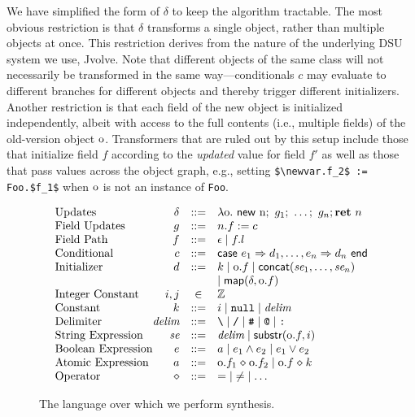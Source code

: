 \documentclass[natbib,10pt]{sigplanconf}
\newcommand{\code}[1]{\lstinline|#1|\xspace}
\begin{document}
We have simplified the form of $\delta$ to keep the algorithm
tractable.  The most obvious restriction is that $\delta$ transforms a
single object, rather than multiple objects at once.  This restriction
derives from the nature of the underlying DSU system we use,
Jvolve.  Note that different objects of the same class will not
necessarily be transformed in the same way---conditionals $c$ may
evaluate to different branches for different objects and thereby
trigger different initializers.  Another restriction is that each
field of the new object is initialized independently, albeit with
access to the full contents (i.e., multiple fields) of the old-version
object $\textrm{o}$.  Transformers that are ruled out by this setup
include those that initialize field $f$ according to the
\emph{updated} value for field $f'$ as well as those that pass
values across the object graph, e.g., setting
\code{$\newvar.f_2$ := Foo.$f_1$} when $\textrm{o}$ is not an instance
of \code{Foo}.

\begin{figure}
\small
\[
\begin{array}{l@{}rcl}
\text{Updates} & \delta & \bnfas & \lambda \oldvar.\ \anew \newvar;\
g_1;\ \ldots;\ g_n; \return\ n\\
\text{Field Updates} & g & \bnfas & n.f := c \\
\text{Field Path} & f & \bnfas & \epsilon \mid f.l \\
\text{Conditional} & c & \bnfas & \casestart e_1 \carrow d_1, \ldots, e_n \carrow d_n \caseend \\
\text{Initializer} & d & \bnfas & k \mid \oldvar.f \mid \sconcat(\se_1,\ldots,\se_n) \\
& & & \mid \map(\delta, \oldvar.f) \\
\text{Integer Constant} & i, j & \in & \mathbb{Z} \\
\text{Constant} & k & \bnfas & i \mid \texttt{null} \mid \delim \\
\text{Delimiter} & \delim & \bnfas & \texttt{\textbackslash} \mid \texttt{/} \mid \texttt{\#} \mid \texttt{@} \mid \texttt{:} \\
\text{String Expression} & \se & \bnfas & \delim \mid \substr(\oldvar.f,i)\\
\text{Boolean Expression} & e & \bnfas & a \mid e_1 \wedge e_2 \mid e_1 \vee e_2 \\
\text{Atomic Expression} & a & \bnfas & \oldvar.f_1 \op \oldvar.f_2 \mid \oldvar.f \op k \\
\text{Operator} & \op & \bnfas & \mathord{=} \mid \mathord{\neq} \mid \ldots
\end{array}
\]
\caption{\label{fig:language}The language over which we perform synthesis.}
\end{figure}
\end{document}
